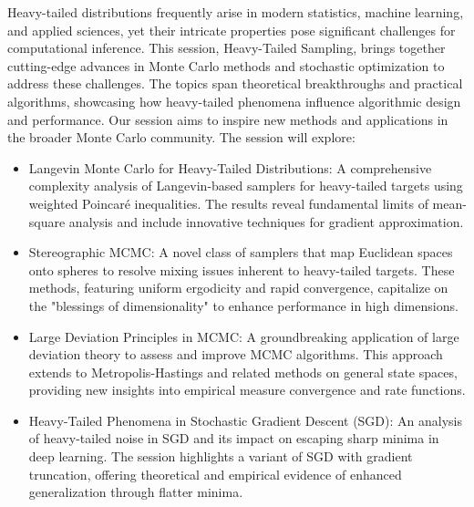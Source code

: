 \begin{session}
 {}%
 {}%
 Heavy-tailed distributions frequently arise in modern statistics, machine learning, and applied sciences, yet their intricate properties pose significant challenges for computational inference. This session, Heavy-Tailed Sampling, brings together cutting-edge advances in Monte Carlo methods and stochastic optimization to address these challenges. The topics span theoretical breakthroughs and practical algorithms, showcasing how heavy-tailed phenomena influence algorithmic design and performance. Our session aims to inspire new methods and applications in the broader Monte Carlo community. The session will explore:
 \begin{itemize}
 \item
 Langevin Monte Carlo for Heavy-Tailed Distributions: A comprehensive complexity analysis of Langevin-based samplers for heavy-tailed targets using weighted Poincar\'e inequalities. The results reveal fundamental limits of mean-square analysis and include innovative techniques for gradient approximation.
 \item
 Stereographic MCMC: A novel class of samplers that map Euclidean spaces onto spheres to resolve mixing issues inherent to heavy-tailed targets. These methods, featuring uniform ergodicity and rapid convergence, capitalize on the "blessings of dimensionality" to enhance performance in high dimensions.
 \item
 Large Deviation Principles in MCMC: A groundbreaking application of large deviation theory to assess and improve MCMC algorithms. This approach extends to Metropolis-Hastings and related methods on general state spaces, providing new insights into empirical measure convergence and rate functions.
 \item
 Heavy-Tailed Phenomena in Stochastic Gradient Descent (SGD): An analysis of heavy-tailed noise in SGD and its impact on escaping sharp minima in deep learning. The session highlights a variant of SGD with gradient truncation, offering theoretical and empirical evidence of enhanced generalization through flatter minima.
 \end{itemize}
\end{session}



\clearpage

